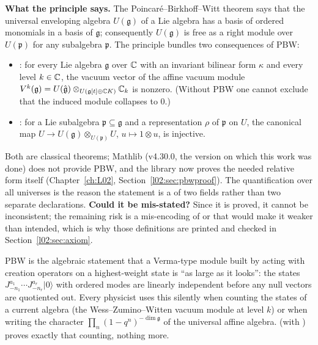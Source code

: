 \begin{dictionary}
\textbf{What the principle says.} The Poincar\'e--Birkhoff--Witt theorem says that the universal
enveloping algebra $U(\mathfrak g)$ of a Lie algebra has a basis of ordered monomials in a basis of
$\mathfrak g$; consequently $U(\mathfrak g)$ is free as a right module over $U(\mathfrak p)$ for any
subalgebra $\mathfrak p$. The principle bundles two consequences of PBW:
\begin{itemize}
\item {}: for every Lie algebra $\mathfrak g$ over ${\mathbb{C}}$ with an invariant
  bilinear form $\kappa$ and every level $k\in{\mathbb{C}}$, the vacuum vector of the affine vacuum module
  $V^k(\mathfrak g)=U(\hat{\mathfrak g})\otimes_{U(\mathfrak g[t]\oplus{\mathbb{C}} K)}{\mathbb{C}}_k$ is nonzero.
  (Without PBW one cannot exclude that the induced module collapses to $0$.)
\item {}: for a Lie subalgebra $\mathfrak p\subseteq\mathfrak g$ and a
  representation $\rho$ of $\mathfrak p$ on $U$, the canonical map
  $U\to U(\mathfrak g)\otimes_{U(\mathfrak p)}U$, $u\mapsto 1\otimes u$, is injective.
\end{itemize}
Both are classical theorems; Mathlib (v4.30.0, the version on which this work was done) does not provide PBW, and the library now proves
the needed relative form itself (Chapter~\ref{ch:L02}, Section~\ref{l02:sec:pbwproof}). The
quantification over all universes  is the
reason the statement is a  of two fields rather than two separate declarations.
\textbf{Could it be mis-stated?} Since it is proved, it cannot be inconsistent; the remaining
risk is a mis-encoding of  or  that would make it
weaker than intended, which is why
those definitions are printed and checked in Section~\ref{l02:sec:axiom}.
\end{dictionary}

\begin{physics}
PBW is the algebraic statement that a Verma-type module built by acting with creation operators on
a highest-weight state is ``as large as it looks'': the states
$J^{a_1}_{-n_1}\cdots J^{a_r}_{-n_r}|0\rangle$ with ordered modes are linearly independent before any
null vectors are quotiented out. Every physicist uses this silently when counting the states of a
current algebra (the Wess--Zumino--Witten vacuum module at level $k$) or when writing the character
$\prod_n(1-q^n)^{-\dim\mathfrak g}$ of the universal affine algebra.  (with ) proves exactly
that counting, nothing more.
\end{physics}

